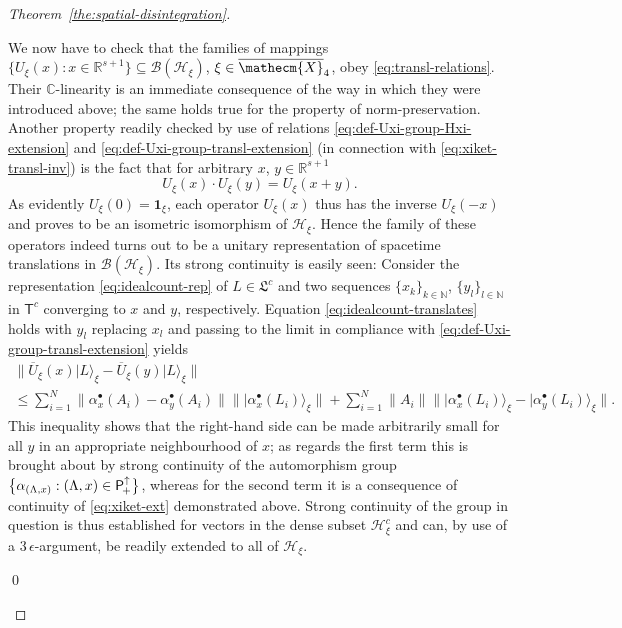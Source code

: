 \documentclass[a4paper,a4paper]{article}
\numberwithin{equation}{section}
\newcommand{\Cbb}{\mathbb{C}}
\newcommand{\Nbb}{\mathbb{N}}
\newcommand{\Hscr}{\mathscr{H}}
\newcommand{\unit}{\mathbf{1}}
\newcommand{\Rsone}{\mathbb{R}^{s + 1}}
\newcommand{\Xecmbar}{\overline{\mathecm{X}}}
\newcommand{\Ubarxi}{\overline{U}_\xi}
\newcommand{\BHxi}{\mathscr{B} ( \mathscr{H}_\xi )}
\newcommand{\Poin}{\mathsf{P}_{\negthinspace +}^\uparrow}
\newcommand{\aLax}{\alpha_{( \Lambda , x )}}
\newcommand{\abulletx}{\alpha^\bullet_x}
\newcommand{\abullety}{\alpha^\bullet_y}
\newcommand{\Tcount}{\mathsf{T}^c}
\newcommand{\idealcount}{\mathfrak{L}^c}
\newcounter{proofitem}
\newenvironment{prooflist}{\begin{list}{(\roman{proofitem})}%
  {\usecounter{proofitem} \setlength{\topsep}{0ex}%
   \setlength{\parsep}{0.2ex} \setlength{\itemsep}{0.4ex}%
   \setlength{\leftmargin}{0em} \setlength{\itemindent}{0.5em}%
   \setlength{\listparindent}{1em}}}{\qed \end{list}}
\theoremstyle{definition}
\theoremstyle{plain}
\theoremstyle{remark}
\theoremstyle{assumption}
\newcommand{\set}[1]{\{ #1 \}}
\newcommand{\bset}[1]{\bigl\{ #1 \bigr\}}
\newcommand{\norm}[1]{\lVert #1 \rVert}
\newcommand{\bnorm}[1]{\bigl\lVert #1 \bigr\rVert}
\newcommand{\xiket}[1]{\vert #1 \rangle_\xi}
\newcommand{\bxiket}[1]{\big\vert #1 \bigr\rangle_\xi}
\begin{document}
\begin{proof}[Theorem~\ref{the:spatial-disintegration}]
\begin{prooflist}
      We now have to check that the families of mappings $\bset{U_\xi
      ( x ) : x \in \Rsone} \subseteq \BHxi$, $\xi \in \Xecmbar_4$,
      obey \eqref{eq:transl-relations}. Their $\Cbb$-linearity is an
      immediate consequence of the way in which they were introduced
      above; the same holds true for the property of
      norm-preservation. Another property readily checked by use of
      relations \eqref{eq:def-Uxi-group-Hxi-extension} and
      \eqref{eq:def-Uxi-group-transl-extension} (in connection with
      \eqref{eq:xiket-transl-inv}) is the fact that for arbitrary $x$,
      $y \in \Rsone$
      \begin{equation}
        \label{eq:Uxi-group-property}
        U_\xi ( x ) \cdot U_\xi ( y ) = U_\xi ( x + y ) \text{.}
      \end{equation}
      As evidently $U_\xi ( 0 ) = \unit_\xi$, each operator $U_\xi ( x
      )$ thus has the inverse $U_\xi ( - x )$ and proves to be an
      isometric isomorphism of $\Hscr_\xi$. Hence the family of these
      operators indeed turns out to be a unitary representation of
      spacetime translations in $\BHxi$. Its strong continuity is
      easily seen: Consider the representation
      \eqref{eq:idealcount-rep} of $L \in \idealcount$ and two
      sequences $\set{x_k}_{k \in \Nbb}$, $\set{y_l}_{l \in \Nbb}$ in
      $\Tcount$ converging to $x$ and $y$, respectively. Equation
      \eqref{eq:idealcount-translates} holds with $y_l$ replacing
      $x_l$ and passing to the limit in compliance with
      \eqref{eq:def-Uxi-group-transl-extension} yields
      \begin{multline}
        \label{eq:Uxi-group-strong-cont}
        \bnorm{\Ubarxi ( x ) \xiket{L} - \Ubarxi ( y ) \xiket{L}} \\
        \leqslant \sum_{i = 1}^N \bnorm{\abulletx ( A_i ) - \abullety
        ( A_i )} \bnorm{\bxiket{\abulletx ( L_i )}} + \sum_{i = 1}^N
        \norm{A_i} \bnorm{\bxiket{\abulletx ( L_i )} -
        \bxiket{\abullety ( L_i )}} \text{.}
      \end{multline}
      This inequality shows that the right-hand side can be made
      arbitrarily small for all $y$ in an appropriate neighbourhood of
      $x$; as regards the first term this is brought about by strong
      continuity of the automorphism group $\bset{\aLax : ( \Lambda ,
      x ) \in \Poin}$, whereas for the second term it is a
      consequence of continuity of \eqref{eq:xiket-ext} demonstrated
      above. Strong continuity of the group in question is thus
      established for vectors in the dense subset $\Hscr_\xi^c$ and
      can, by use of a $3\,\epsilon$-argument, be readily extended to
      all of $\Hscr_\xi$.
    

\end{prooflist}
\end{proof}
\end{document}

